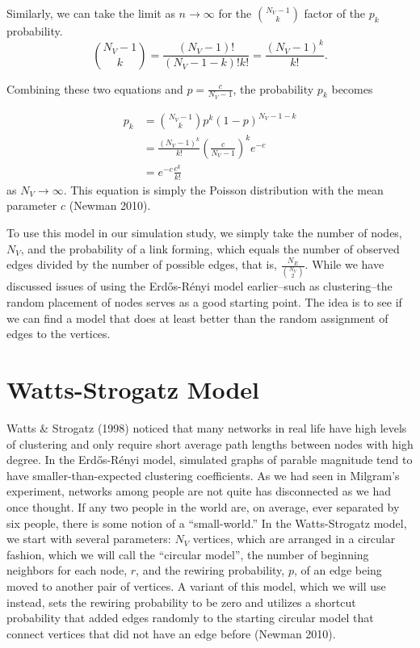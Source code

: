 \documentclass[12pt,twoside]{amherstthesis}
\begin{document}
  Similarly, we can take the limit as \(n \to \infty\) for the
  \({N_{V} - 1 \choose k}\) factor of the \(p_k\) probability.
  \[{N_{V} - 1 \choose k} = \frac {(N_{V} - 1)!} {(N_{V} - 1 - k)!k!} = \frac {(N_{V} - 1)^{k}} {k!}.\]
  
  Combining these two equations and \(p = \frac {c} {N_{V} - 1}\), the
  probability \(p_{k}\) becomes
  
  \[
  \begin{aligned}
  p_{k} &= {N_{V} -1 \choose k}p^{k}(1 - p)^{N_{V} - 1 - k} \\
  &= \frac {(N_{V} - 1)^{k}} {k!}\left(\frac {c} {N_{V} - 1}\right)^{k}e^{-c} \\
  &= e^{-c} \frac{c^{k}} {k!}
  \end{aligned}
  \] as \(N_{V} \to \infty\). This equation is simply the Poisson
  distribution with the mean parameter \(c\) (Newman 2010).
  
  To use this model in our simulation study, we simply take the number of
  nodes, \(N_{V}\), and the probability of a link forming, which equals
  the number of observed edges divided by the number of possible edges,
  that is, \(\frac{N_{E}} {{N_{V} \choose 2}}\). While we have discussed
  issues of using the Erdős-Rényi model earlier--such as clustering--the
  random placement of nodes serves as a good starting point. The idea is
  to see if we can find a model that does at least better than the random
  assignment of edges to the vertices.
  
  \section{Watts-Strogatz Model}\label{watts-strogatz-model}
  
  Watts \& Strogatz (1998) noticed that many networks in real life have
  high levels of clustering and only require short average path lengths
  between nodes with high degree. In the Erdős-Rényi model, simulated
  graphs of parable magnitude tend to have smaller-than-expected
  clustering coefficients. As we had seen in Milgram's experiment,
  networks among people are not quite has disconnected as we had once
  thought. If any two people in the world are, on average, ever separated
  by six people, there is some notion of a ``small-world.'' In the
  Watts-Strogatz model, we start with several parameters: \(N_V\)
  vertices, which are arranged in a circular fashion, which we will call
  the ``circular model'', the number of beginning neighbors for each node,
  \(r\), and the rewiring probability, \(p\), of an edge being moved to
  another pair of vertices. A variant of this model, which we will use
  instead, sets the rewiring probability to be zero and utilizes a
  shortcut probability that added edges randomly to the starting circular
  model that connect vertices that did not have an edge before (Newman
  2010).
  
\end{document}
